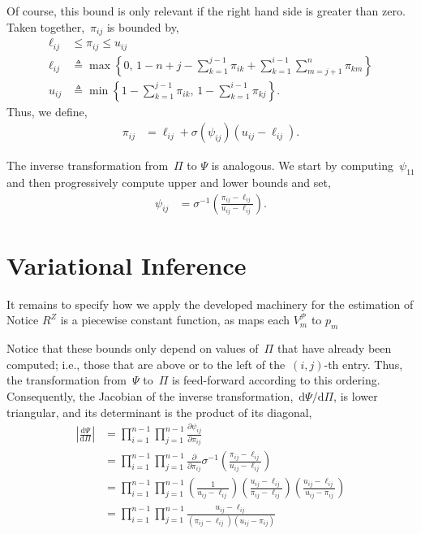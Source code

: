 \documentclass{article}
\begin{document}
Of course, this bound is only relevant if the right hand side is greater than zero.
Taken together,~${\pi}_{ij}$ is bounded by,
\begin{align}
\ell_{ij} &\leq
{\pi}_{ij}
\leq
u_{ij}
\\
\ell_{ij} &\triangleq \max \left \{0, \, 1 - n + j - \sum_{k=1}^{j-1} {\pi}_{ik}  +  \sum_{k=1}^{i-1} \sum_{m=j+1}^n {\pi}_{km} \right \}
\\
u_{ij} &\triangleq 
\min \left \{1- \sum_{k=1}^{j-1} {\pi}_{ik}, \,
1- \sum_{k=1}^{i-1} {\pi}_{kj} \right\}.
\end{align}
Thus, we define,
\begin{align}
  {\pi}_{ij} &= \ell_{ij} + \sigma(\psi_{ij}) (u_{ij} - \ell_{ij}).
\end{align}

The inverse transformation from~${\Pi}$ to $\Psi$ is analogous.
We start by computing~$\psi_{11}$ and then progressively compute
upper and lower bounds and set,
\begin{align}
\psi_{ij} &= \sigma^{-1} \left( \frac{{\pi}_{ij} - \ell_{ij}}{u_{ij} - \ell_{ij}} \right ).
\end{align}



 \section{Variational Inference}
 It remains to specify how we apply the developed machinery for the estimation of 
Notice $R^Z$ is a piecewise constant function, as maps each $V^\mathcal{P}_{m}$ to $p_m$


Notice that these bounds only depend on values of~${\Pi}$ that
have already been computed; i.e., those that are above or to the left of
the~$(i,j)$-th entry. Thus, the transformation from~$\Psi$ to~${\Pi}$
is feed-forward according to this ordering.  Consequently, the
Jacobian of the inverse transformation,~$\mathrm{d}\Psi / \mathrm{d} \Pi$,
is lower triangular, and its determinant is the product of its diagonal,
\begin{align}
\left| \frac{\mathrm{d} \Psi } {\mathrm{d} \Pi} \right|
&= \prod_{i=1}^{n-1} \prod_{j=1}^{n-1} \frac{\partial \psi_{ij} }{\partial {\pi}_{ij}} \\
&= \prod_{i=1}^{n-1} \prod_{j=1}^{n-1} \frac{\partial}{\partial {\pi}_{ij}}
\sigma^{-1} \left( \frac{{\pi}_{ij} - \ell_{ij}}{u_{ij} - \ell_{ij}} \right ) \\
&= \prod_{i=1}^{n-1} \prod_{j=1}^{n-1}
\left( \frac{1}{u_{ij} - \ell_{ij}} \right )
\left( \frac{u_{ij} - \ell_{ij}}{{\pi}_{ij} - \ell_{ij}} \right )
\left( \frac{u_{ij} - \ell_{ij}}{u_{ij} - {\pi}_{ij}} \right ) \\
&= \prod_{i=1}^{n-1} \prod_{j=1}^{n-1}
\frac{u_{ij} - \ell_{ij}}{({\pi}_{ij} - \ell_{ij}) (u_{ij} - {\pi}_{ij})}
\end{align}
\end{document}

